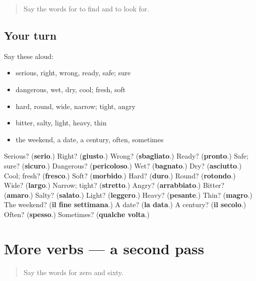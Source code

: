 \label{lesson:IT-R136-first-pass-time-numbers-and-verbs}



\begin{quote}
Say the words for to find and to look for.
\end{quote}

\subsection*{Your turn}
Say these aloud:

\begin{itemize}
\raggedright
  \item serious, right, wrong, ready, safe; sure
  \item dangerous, wet, dry, cool; fresh, soft
  \item hard, round, wide, narrow; tight, angry
  \item bitter, salty, light, heavy, thin
  \item the weekend, a date, a century, often, sometimes
\end{itemize}

\begin{tcolorbox}[breakable,colback=teal!4,colframe=teal!35!black,title={Before you move on}]
Serious? (\textbf{serio}.) Right? (\textbf{giusto}.) Wrong? (\textbf{sbagliato}.) Ready? (\textbf{pronto}.) Safe; sure? (\textbf{sicuro}.) Dangerous? (\textbf{pericoloso}.) Wet? (\textbf{bagnato}.) Dry? (\textbf{asciutto}.) Cool; fresh? (\textbf{fresco}.) Soft? (\textbf{morbido}.) Hard? (\textbf{duro}.) Round? (\textbf{rotondo}.) Wide? (\textbf{largo}.) Narrow; tight? (\textbf{stretto}.) Angry? (\textbf{arrabbiato}.) Bitter? (\textbf{amaro}.) Salty? (\textbf{salato}.) Light? (\textbf{leggero}.) Heavy? (\textbf{pesante}.) Thin? (\textbf{magro}.) The weekend? (\textbf{il fine settimana}.) A date? (\textbf{la data}.) A century? (\textbf{il secolo}.) Often? (\textbf{spesso}.) Sometimes? (\textbf{qualche volta}.)
\end{tcolorbox}
\section[(dialogue)]{More verbs — a second pass}

\label{lesson:IT-R136-second-pass-more-verbs}



\begin{quote}
Say the words for zero and sixty.
\end{quote}

